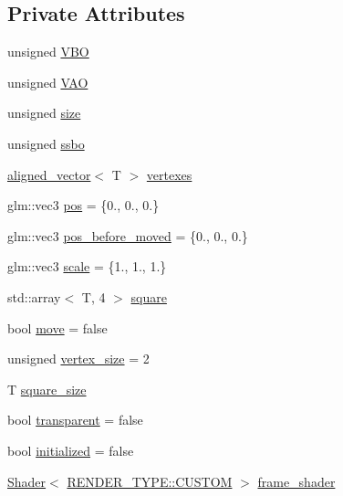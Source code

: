 \subsection*{Private Attributes}
\begin{DoxyCompactItemize}
\item 
unsigned \mbox{\hyperlink{classSpinArray_a6f7dbbcaa09c3ee96fb7a84f294d27ef}{V\+BO}}
\item 
unsigned \mbox{\hyperlink{classSpinArray_a401bb65ae9fedcb1fdbd6abe934202c2}{V\+AO}}
\item 
unsigned \mbox{\hyperlink{classSpinArray_abc99162bc4fea88c6437f7434710b536}{size}}
\item 
unsigned \mbox{\hyperlink{classSpinArray_ac72b8fb384152ac1cb9c0d552757ceec}{ssbo}}
\item 
\mbox{\hyperlink{type__definitions_8hpp_a087efd587d66b881646ef378f1919c90}{aligned\+\_\+vector}}$<$ T $>$ \mbox{\hyperlink{classSpinArray_a41321e5fb43468362ac6d1743d449b45}{vertexes}}
\item 
glm\+::vec3 \mbox{\hyperlink{classSpinArray_ae9052b9d2725a355e185a2fc56b138d5}{pos}} = \{0., 0., 0.\}
\item 
glm\+::vec3 \mbox{\hyperlink{classSpinArray_a11a3a9cc8a740ad2af4b2403a23519ac}{pos\+\_\+before\+\_\+moved}} = \{0., 0., 0.\}
\item 
glm\+::vec3 \mbox{\hyperlink{classSpinArray_a9017aa16c2bf03e46c50f94c08ad9346}{scale}} = \{1., 1., 1.\}
\item 
std\+::array$<$ T, 4 $>$ \mbox{\hyperlink{classSpinArray_a39a3d599198f85f7af7dc84f83f07efd}{square}}
\item 
bool \mbox{\hyperlink{classSpinArray_a59fb1e92a58e498f10e370ac5ea29174}{move}} = false
\item 
unsigned \mbox{\hyperlink{classSpinArray_aab5a46c249bbf477555a4fe4273fcb8b}{vertex\+\_\+size}} = 2
\item 
T \mbox{\hyperlink{classSpinArray_ae14d40ebd99d86b863043c727d840d8f}{square\+\_\+size}}
\item 
bool \mbox{\hyperlink{classSpinArray_ac9eb9d80a9d00460b291e080714648b2}{transparent}} = false
\item 
bool \mbox{\hyperlink{classSpinArray_a1f55995a2d688afe24b401808c1b89ae}{initialized}} = false
\item 
\mbox{\hyperlink{classShader}{Shader}}$<$ \mbox{\hyperlink{shader__class_8hpp_a24e288e18eb7b6e01de7565001fedb60a72baef04098f035e8a320b03ad197818}{R\+E\+N\+D\+E\+R\+\_\+\+T\+Y\+P\+E\+::\+C\+U\+S\+T\+OM}} $>$ \mbox{\hyperlink{classSpinArray_a38b047bbf2238e86980eff7836ebb295}{frame\+\_\+shader}}

\end{DoxyCompactItemize}
